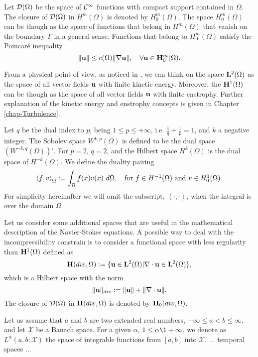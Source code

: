 Let $\mathcal{D}(\Omega)$ be the space of $\mathcal{C}^\infty$ functions with compact support contained in $\Omega$. The closure of $\mathcal{D}(\Omega)$ in $H^m(\Omega)$ is denoted by $H^m_0(\Omega)$. The space $H^m_0(\Omega)$ can be though as the space of functions that belong in $H^m(\Omega)$ that vanish on the boundary $\Gamma$ in a general sense. Functions that belong to $H^m_0(\Omega)$ satisfy the Poincaré inequality
\begin{equation}
\label{eq-Poincare_inequality}
\|{\bf u}\|\leq c(\Omega)\|\nabla{\bf u}\|,\quad\forall{\bf u}\in{\bf H}^m_0(\Omega).
\end{equation}

From a physical point of view, as noticed in \cite{Foias}, we can think on the space ${\bf L}^2(\Omega)$ as the space of all vector fields ${\bf u}$ with finite kinetic energy. Moreover, the ${\bf H}^1(\Omega)$ can be though as the space of all vector fields ${\bf u}$ with finite enstrophy. Further explanation of the kinetic energy and enstrophy concepts is given in Chapter \ref{chap-Turbulence}.

Let $ q $ be the dual index to $ p $, being $ 1\le p\le+\infty $, i.e. $ \frac{1}{q}+\frac{1}{p}=1 $, and $ k $ a negative integer. The Sobolev space $ W^{k,p}(\Omega) $ is defined to be the dual space $ \left(W^{-k,q}(\Omega)\right)' $. For $ p=2 $, $ q=2 $, and the Hilbert space $ H^k(\Omega) $ is the dual space of $ H^{-k}(\Omega) $. We define the duality pairing 
$$ \left\langle f,v\right\rangle_\Omega:=\int_{\Omega}f(x)v(x)\ d\Omega,\quad\mbox{for $ f\in H^{-1}(\Omega) $ and $ v\in H^1_0(\Omega) $}. $$
For simplicity hereinafter we will omit the subscript, $ \left\langle\cdot,\cdot\right\rangle $, when the integral is over the domain $ \Omega $.

Let us consider some additional spaces that are useful in the mathematical description of the Navier-Stokes equations. A possible way to deal with the incompressibility constrain  is to consider a functional space with less regularity than ${\bf H}^1(\Omega)$ defined as
$${\bf H}(div,\Omega):=\{{\bf u}\in{\bf L}^2(\Omega)|\nabla\cdot{\bf u}\in{\bf L}^2(\Omega)\},$$
which is a Hilbert space with the norm
$$\|{\bf u}\|_{div}:=\|{\bf u}\|+\|\nabla\cdot{\bf u}\|.$$
The closure of $\mathcal{D}(\Omega)$ in ${\bf H}(div,\Omega)$ is denoted by ${\bf H}_0(div,\Omega)$.

Let us assume that $ a $ and $ b $ are two extended real numbers, $ -\infty\le a < b\le\infty $, and let $ \mathcal{X} $ be a Banach space. For a given $ \alpha $, $ 1\le\alpha\l +\infty $, we denote as $ L^\alpha(a,b;\mathcal{X}) $ the space of integrable functions from $ \left[a,b\right] $ into $ \mathcal{X} $.
{\color{red}... temporal spaces ...}